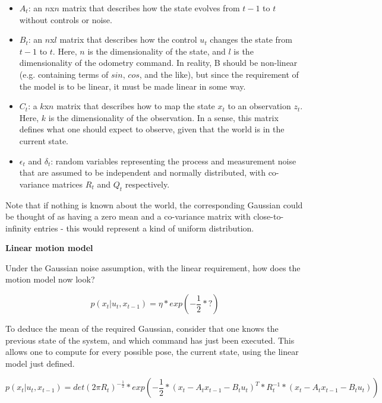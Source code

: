 \documentclass[a4paper]{article}
\begin{document}
\begin{itemize}
    \item $A_t$: an $n$x$n$ matrix that describes how the state evolves from $t-1$ to $t$ without controls or noise.
    \item $B_t$: an $n$x$l$ matrix that describes how the control $u_t$ changes the state from $t-1$ to $t$. Here, $n$ is the dimensionality of the state, and $l$ is the dimensionality of the odometry command. In reality, B should be non-linear (e.g. containing terms of $sin$, $cos$, and the like), but since the requirement of the model is to be linear, it must be made linear in some way.
    \item $C_t$: a $k$x$n$ matrix that describes how to map the state $x_t$ to an observation $z_t$. Here, $k$ is the dimensionality of the observation. In a sense, this matrix defines what one should expect to observe, given that the world is in the current state.
    \item $\epsilon_t$ and $\delta_t$: random variables representing the process and measurement noise that are assumed to be independent and normally distributed, with co-variance matrices $R_t$ and $Q_t$ respectively.
\end{itemize}

Note that if nothing is known about the world, the corresponding Gaussian could be thought of as having a zero mean and a co-variance matrix with close-to-infinity entries - this would represent a kind of uniform distribution.

\textbf{Linear motion model}

Under the Gaussian noise assumption, with the linear requirement, how does the motion model now look?

\begin{equation*}
    p(x_t| u_t, x_{t-1}) = \eta * exp(-\frac{1}{2} * \textbf{?})
\end{equation*}

To deduce the mean of the required Gaussian, consider that one knows the previous state of the system, and which command has just been executed. This allows one to compute for every possible pose, the current state, using the linear model just defined.

\begin{equation*}
    p(x_t| u_t, x_{t-1}) = det(2\pi R_t)^{-\frac{1}{2}} * exp(-\frac{1}{2} * (x_t - A_t x_{t-1} - B_t u_t)^T * R_t^{-1} * (x_t - A_t x_{t-1} - B_t u_t) )
\end{equation*}
\end{document}
